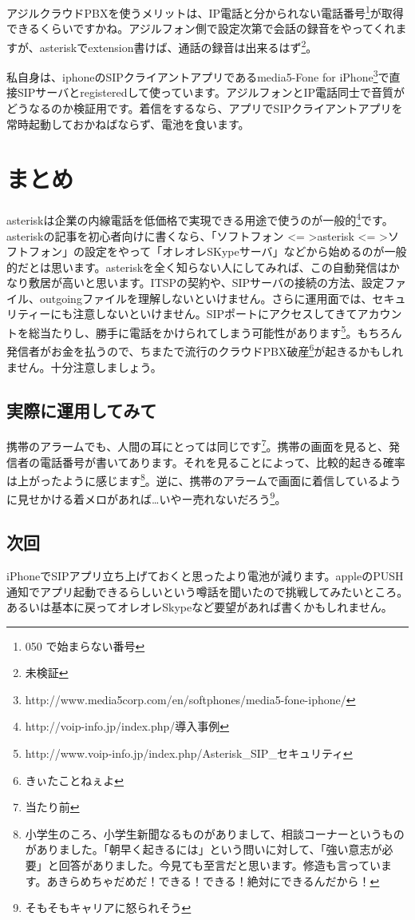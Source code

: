 アジルクラウドPBXを使うメリットは、IP電話と分かられない電話番号\footnote{050 で始まらない番号}が取得できるくらいですかね。アジルフォン側で設定次第で会話の録音をやってくれますが、asteriskでextension書けば、通話の録音は出来るはず\footnote{未検証}。

私自身は、iphoneのSIPクライアントアプリであるmedia5-Fone for iPhone\footnote{http://www.media5corp.com/en/softphones/media5-fone-iphone/}で直接SIPサーバとregisteredして使っています。アジルフォンとIP電話同士で音質がどうなるのか検証用です。着信をするなら、アプリでSIPクライアントアプリを常時起動しておかねばならず、電池を食います。

\section{まとめ}
asteriskは企業の内線電話を低価格で実現できる用途で使うのが一般的\footnote{http://voip-info.jp/index.php/導入事例}です。asteriskの記事を初心者向けに書くなら、「ソフトフォン \textless = \textgreater asterisk \textless = \textgreater ソフトフォン」の設定をやって「オレオレSKypeサーバ」などから始めるのが一般的だとは思います。asteriskを全く知らない人にしてみれば、この自動発信はかなり敷居が高いと思います。ITSPの契約や、SIPサーバの接続の方法、設定ファイル、outgoingファイルを理解しないといけません。さらに運用面では、セキュリティーにも注意しないといけません。SIPポートにアクセスしてきてアカウントを総当たりし、勝手に電話をかけられてしまう可能性があります\footnote{http://www.voip-info.jp/index.php/Asterisk\_SIP\_セキュリティ}。もちろん発信者がお金を払うので、ちまたで流行のクラウドPBX破産\footnote{きぃたことねぇよ}が起きるかもしれません。十分注意しましょう。

\subsection{実際に運用してみて}
携帯のアラームでも、人間の耳にとっては同じです\footnote{当たり前}。携帯の画面を見ると、発信者の電話番号が書いてあります。それを見ることによって、比較的起きる確率は上がったように感じます\footnote{小学生のころ、小学生新聞なるものがありまして、相談コーナーというものがありました。「朝早く起きるには」という問いに対して、「強い意志が必要」と回答がありました。今見ても至言だと思います。修造も言っています。あきらめちゃだめだ！できる！できる！絶対にできるんだから！}。逆に、携帯のアラームで画面に着信しているように見せかける着メロがあれば…いやー売れないだろう\footnote{そもそもキャリアに怒られそう}。

\subsection{次回}
iPhoneでSIPアプリ立ち上げておくと思ったより電池が減ります。appleのPUSH通知でアプリ起動できるらしいという噂話を聞いたので挑戦してみたいところ。あるいは基本に戻ってオレオレSkypeなど要望があれば書くかもしれません。

